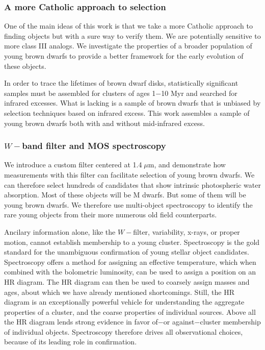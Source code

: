 \documentclass[12pt,preprint]{aastex}
\begin{document}
\subsubsection{A more Catholic approach to selection}
One of the main ideas of this work is that we take a more Catholic approach to finding objects but with a sure way to verify them.  We are potentially sensitive to more class III analogs.  We investigate the properties of a broader population of young brown dwarfs to provide a better framework for the early evolution of these objects.

In order to trace the lifetimes of brown dwarf disks, statistically significant samples must be assembled for clusters of ages 1$-$10 Myr and searched for infrared excesses.  What is lacking is a sample of brown dwarfs that is unbiased by selection techniques based on infrared excess.  This work assembles a sample of young brown dwarfs both with and without mid-infrared excess.

\subsubsection{ $W-$band filter and MOS spectroscopy}
We introduce a custom filter centered at 1.4$\;\mu$m, and demonstrate how measurements with this filter can facilitate selection of young brown dwarfs.  We can therefore select hundreds of candidates that show intrinsic photospheric water absorption.  Most of these objects will be M dwarfs.  But some of them will be young brown dwarfs.  We therefore use multi-object spectroscopy to identify the rare young objects from their more numerous old field counterparts.

Ancilary information alone, like the $W-$filter, variability, x-rays, or proper motion, cannot establish membership to a young cluster.  Spectroscopy is the gold standard for the unambiguous confirmation of young stellar object candidates.  Spectroscopy offers a method for assigning an effective temperature, which when combined with the bolometric luminosity, can be used to assign a position on an HR diagram.  The HR diagram can then be used to coarsely assign masses and ages, about which we have already mentioned shortcomings.  Still, the HR diagram is an exceptionally powerful vehicle for understanding the aggregate properties of a cluster, and the coarse properties of individual sources.  Above all the HR diagram lends strong evidence in favor of$-$or against$-$cluster membership of individual objects.  Spectroscopy therefore drives all observational choices, because of its leading role in confirmation.
\end{document}
